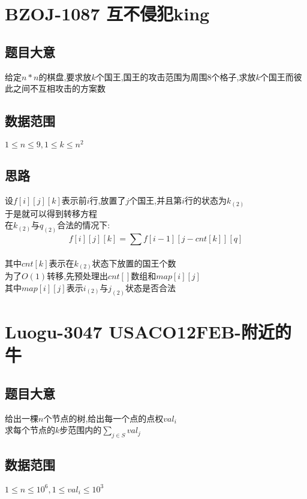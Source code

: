 \documentclass{ctexart}
\numberwithin{equation}{section}
\begin{document}
\begin{flushleft}
  \newpage

  \section{BZOJ-1087 互不侵犯king}
  \subsection{题目大意}
  给定$n*n$的棋盘,要求放$k$个国王,国王的攻击范围为周围$8$个格子,求放$k$个国王而彼此之间不互相攻击的方案数 \\
  \subsection{数据范围}
  $1\le n \le 9,1\le k \le n^2$ \\
  \subsection{思路}
  设$f[i][j][k]$表示前$i$行,放置了$j$个国王,并且第$i$行的状态为$k_{(2)}$ \\
  于是就可以得到转移方程 \\
  在$k_{(2)}$与$q_{(2)}$合法的情况下:
  $$f[i][j][k] = \sum{f[i-1][j-cnt[k]][q]}$$ \\
  其中$cnt[k]$表示在$k_{(2)}$状态下放置的国王个数 \\
  为了$O(1)$转移,先预处理出$cnt[]$数组和$map[i][j]$\\
  其中$map[i][j]$表示$i_{(2)}$与$j_{(2)}$状态是否合法 \\
  \newpage

  \section{Luogu-3047 USACO12FEB-附近的牛}
  \subsection{题目大意}
  给出一棵$n$个节点的树,给出每一个点的点权$val_i$\\
  求每个节点的$k$步范围内的$\sum_{j \in S}val_j$ \\
  \subsection{数据范围}
  $1\le n \le 10^6,1 \le val_i \le 10^3$ \\

\end{flushleft}
\end{document}
